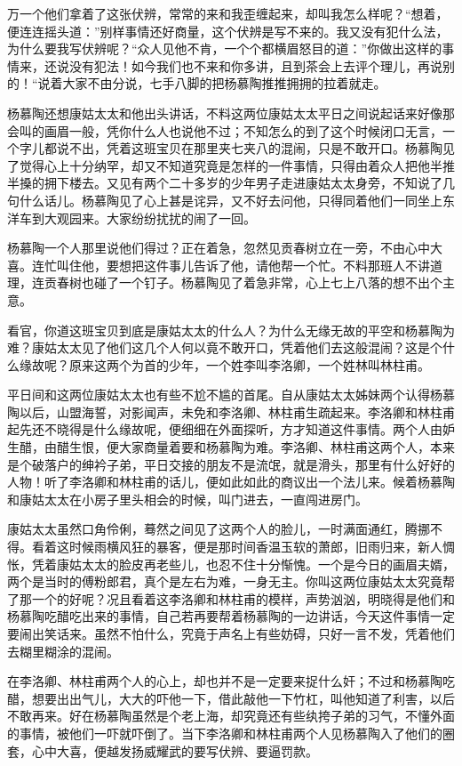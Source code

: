 \documentclass[12pt,UTF8]{ctexbook}
\begin{document}
{{{万一个他们拿着了这张伏辨，常常的来和我歪缠起来，却叫我怎么样呢？“想着，便连连摇头道：”别样事情还好商量，这个伏辨是写不来的。我又没有犯什么法，为什么要我写伏辨呢？“众人见他不肯，一个个都横眉怒目的道：”你做出这样的事情来，还说没有犯法！如今我们也不来和你多讲，且到茶会上去评个理儿，再说别的！“说着大家不由分说，七手八脚的把杨慕陶推推拥拥的拉着就走。

杨慕陶还想康姑太太和他出头讲话，不料这两位康姑太太平日之间说起话来好像那会叫的画眉一般，凭你什么人也说他不过；不知怎么的到了这个时候闭口无言，一个字儿都说不出，凭着这班宝贝在那里夹七夹八的混闹，只是不敢开口。杨慕陶见了觉得心上十分纳罕，却又不知道究竟是怎样的一件事情，只得由着众人把他半推半搡的拥下楼去。又见有两个二十多岁的少年男子走进康姑太太身旁，不知说了几句什么话儿。杨慕陶见了心上甚是诧异，又不好去问他，只得同着他们一同坐上东洋车到大观园来。大家纷纷扰扰的闹了一回。

杨慕陶一个人那里说他们得过？正在着急，忽然见贡春树立在一旁，不由心中大喜。连忙叫住他，要想把这件事儿告诉了他，请他帮一个忙。不料那班人不讲道理，连贡春树也碰了一个钉子。杨慕陶见了着急非常，心上七上八落的想不出个主意。

看官，你道这班宝贝到底是康姑太太的什么人？为什么无缘无故的平空和杨慕陶为难？康姑太太见了他们这几个人何以竟不敢开口，凭着他们去这般混闹？这是个什么缘故呢？原来这两个为首的少年，一个姓李叫李洛卿，一个姓林叫林柱甫。

平日间和这两位康姑太太也有些不尬不尴的首尾。自从康姑太太姊妹两个认得杨慕陶以后，山盟海誓，对影闻声，未免和李洛卿、林柱甫生疏起来。李洛卿和林柱甫起先还不晓得是什么缘故呢，便细细在外面探听，方才知道这件事情。两个人由妒生醋，由醋生恨，便大家商量着要和杨慕陶为难。李洛卿、林柱甫这两个人，本来是个破落户的绅衿子弟，平日交接的朋友不是流氓，就是滑头，那里有什么好好的人物！听了李洛卿和林柱甫的话儿，便如此如此的商议出一个法儿来。候着杨慕陶和康姑太太在小房子里头相会的时候，叫门进去，一直闯进房门。

康姑太太虽然口角伶俐，蓦然之间见了这两个人的脸儿，一时满面通红，腾挪不得。看着这时候雨横风狂的暴客，便是那时间香温玉软的萧郎，旧雨归来，新人惆怅，凭着康姑太太的脸皮再老些儿，也忍不住十分惭愧。一个是今日的画眉夫婿，两个是当时的傅粉郎君，真个是左右为难，一身无主。你叫这两位康姑太太究竟帮了那一个的好呢？况且看着这李洛卿和林柱甫的模样，声势汹汹，明晓得是他们和杨慕陶吃醋吃出来的事情，自己若再要帮着杨慕陶的一边讲话，今天这件事情一定要闹出笑话来。虽然不怕什么，究竟于声名上有些妨碍，只好一言不发，凭着他们去糊里糊涂的混闹。

在李洛卿、林柱甫两个人的心上，却也并不是一定要来捉什么奸；不过和杨慕陶吃醋，想要出出气儿，大大的吓他一下，借此敲他一下竹杠，叫他知道了利害，以后不敢再来。好在杨慕陶虽然是个老上海，却究竟还有些纨挎子弟的习气，不懂外面的事情，被他们一吓就吓倒了。当下李洛卿和林柱甫两个人见杨慕陶入了他们的圈套，心中大喜，便越发扬威耀武的要写伏辨、要逼罚款。

}}}
\end{document}
